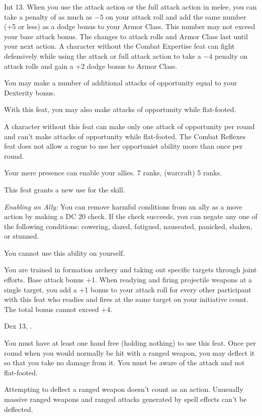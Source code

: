 {}
{Int 13.}
{When you use the attack action or the full attack action in melee, you can take a penalty of as much as $-5$ on your attack roll and add the same number (+5 or less) as a dodge bonus to your Armor Class. This number may not exceed your base attack bonus. The changes to attack rolls and Armor Class last until your next action.}
{A character without the Combat Expertise feat can fight defensively while using the attack or full attack action to take a $-4$ penalty on attack rolls and gain a +2 dodge bonus to Armor Class.}{}

{}
{You may make a number of additional attacks of opportunity equal to your Dexterity bonus.

With this feat, you may also make attacks of opportunity while flat-footed.}
{A character without this feat can make only one attack of opportunity per round and can't make attacks of opportunity while flat-footed.}
{The Combat Reflexes feat does not allow a rogue to use her opportunist ability more than once per round.}{}

{Your mere presence can enable your allies.}
{ 7 ranks,  (warcraft) 5 ranks.}
{This feat grants a new use for the  skill.

\textit{Enabling an Ally:} You can remove harmful conditions from an ally as a move action by making a DC 20  check. If the check succeeds, you can negate any one of the following conditions: cowering, dazed, fatigued, nauseated, panicked, shaken, or stunned.

You cannot use this ability on yourself.}{}{}

{You are trained in formation archery and taking out specific targets through joint efforts.}
{Base attack bonus +1.}
{When readying and firing projectile weapons at a single target, you add a +1 bonus to your attack roll for every other participant with this feat who readies and fires at the same target on your initiative count. The total bonus cannot exceed +4.}{}{}

{Dex 13, .}
{You must have at least one hand free (holding nothing) to use this feat. Once per round when you would normally be hit with a ranged weapon, you may deflect it so that you take no damage from it. You must be aware of the attack and not flat-footed.

Attempting to deflect a ranged weapon doesn't count as an action. Unusually massive ranged weapons and ranged attacks generated by spell effects can't be deflected.}

